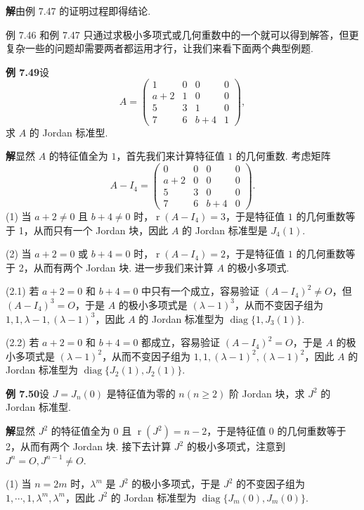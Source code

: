 \documentclass[UTF8,12pt,a4paper,fontset=fandol]{ctexart}
\begin{document}
\noindent\textbf{解}\quad 由例 7.47 的证明过程即得结论.

例 7.46 和例 7.47 只通过求极小多项式或几何重数中的一个就可以得到解答，但更复杂一些的问题却需要两者都运用才行，让我们来看下面两个典型例题.

\noindent\textbf{例 7.49}\quad 设
\[
A=\left(\begin{array}{cccc}
1 & 0 & 0 & 0\\
a+2 & 1 & 0 & 0\\
5 & 3 & 1 & 0\\
7 & 6 & b+4 & 1
\end{array}\right),
\]
求 $A$ 的 Jordan 标准型.

\noindent\textbf{解}\quad 显然 $A$ 的特征值全为 $1$，首先我们来计算特征值 $1$ 的几何重数. 考虑矩阵
\[
A-I_4=
\left(\begin{array}{cccc}
0 & 0 & 0 & 0\\
a+2 & 0 & 0 & 0\\
5 & 3 & 0 & 0\\
7 & 6 & b+4 & 0
\end{array}\right).
\]
(1) 当 $a+2\ne 0$ 且 $b+4\ne 0$ 时，$\operatorname{r}(A-I_4)=3$，于是特征值 $1$ 的几何重数等于 1，从而只有一个 Jordan 块，因此 $A$ 的 Jordan 标准型是 $J_4(1)$.

(2) 当 $a+2=0$ 或 $b+4=0$ 时，$\operatorname{r}(A-I_4)=2$，于是特征值 $1$ 的几何重数等于 2，从而有两个 Jordan 块. 进一步我们来计算 $A$ 的极小多项式.

(2.1) 若 $a+2=0$ 和 $b+4=0$ 中只有一个成立，容易验证 $(A-I_4)^2\ne O$，但 $(A-I_4)^3=O$，于是 $A$ 的极小多项式是 $(\lambda-1)^3$，从而不变因子组为 $1,1,\lambda-1,(\lambda-1)^3$，因此 $A$ 的 Jordan 标准型为 $\operatorname{diag}\{1,J_3(1)\}$.

(2.2) 若 $a+2=0$ 和 $b+4=0$ 都成立，容易验证 $(A-I_4)^2=O$，于是 $A$ 的极小多项式是 $(\lambda-1)^2$，从而不变因子组为 $1,1,(\lambda-1)^2,(\lambda-1)^2$，因此 $A$ 的 Jordan 标准型为 $\operatorname{diag}\{J_2(1),J_2(1)\}$.

\noindent\textbf{例 7.50}\quad 设 $J=J_n(0)$ 是特征值为零的 $n(n\ge 2)$ 阶 Jordan 块，求 $J^2$ 的 Jordan 标准型.

\noindent\textbf{解}\quad 显然 $J^2$ 的特征值全为 0 且 $\operatorname{r}(J^2)=n-2$，于是特征值 0 的几何重数等于 2，从而有两个 Jordan 块. 接下去计算 $J^2$ 的极小多项式，注意到 $J^n=O,J^{n-1}\ne O$.

(1) 当 $n=2m$ 时，$\lambda^m$ 是 $J^2$ 的极小多项式，于是 $J^2$ 的不变因子组为 $1,\cdots,1,\lambda^m,\lambda^m$，因此 $J^2$ 的 Jordan 标准型为 $\operatorname{diag}\{J_m(0),J_m(0)\}$.
\end{document}
